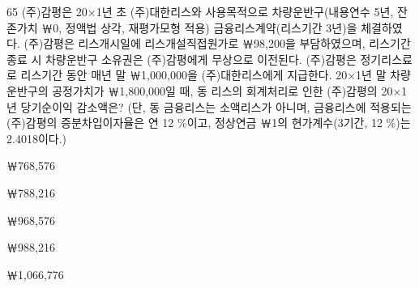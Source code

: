 \begin{question}{65}
(주)감평은 20×1년 초 (주)대한리스와 사용목적으로 차량운반구(내용연수 5년, 잔존가치 ￦0, 정액법 상각, 재평가모형 적용) 금융리스계약(리스기간 3년)을 체결하였다. (주)감평은 리스개시일에 리스개설직접원가로 ￦98,200을 부담하였으며, 리스기간 종료 시 차량운반구 소유권은 (주)감평에게 무상으로 이전된다. (주)감평은 정기리스료로 리스기간 동안 매년 말 ￦1,000,000을 (주)대한리스에게 지급한다. 20×1년 말 차량운반구의 공정가치가 ￦1,800,000일 때, 동 리스의 회계처리로 인한 (주)감평의 20×1년 당기순이익 감소액은? (단, 동 금융리스는 소액리스가 아니며, 금융리스에 적용되는 (주)감평의 증분차입이자율은 연 12 \%이고, 정상연금 ￦1의 현가계수(3기간, 12 \%)는 2.4018이다.)
\begin{choices}
  \item ￦768,576
  \item ￦788,216
  \item ￦968,576
  \item ￦988,216
  \item ￦1,066,776
\end{choices}
\end{question}
